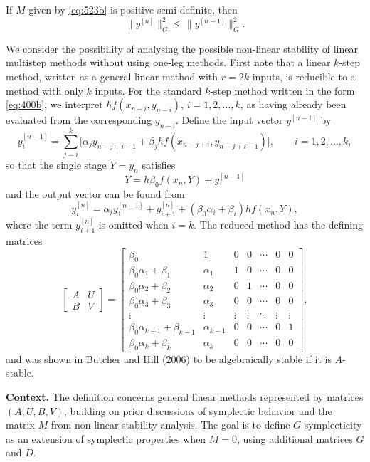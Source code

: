 \begin{theorem}

  \label{thm:523B}
If $M$ given by \eqref{eq:523b} is positive semi-definite, then
\[
\|y^{[n]}\|_G^2 \leq \|y^{[n-1]}\|_G^2.
\]

We consider the possibility of analysing the possible non-linear stability of linear multistep methods without using one-leg methods. First note that a linear $k$-step method, written as a general linear method with $r = 2k$ inputs, is reducible to a method with only $k$ inputs. For the standard $k$-step method written in the form \eqref{eq:400b}, we interpret $hf(x_{n-i}, y_{n-i})$, $i = 1, 2, \dots, k$, as having already been evaluated from the corresponding $y_{n-i}$. Define the input vector $y^{[n-1]}$ by
\[
y_i^{[n-1]} = \sum_{j=i}^{k} \bigl[ \alpha_j y_{n-j+i-1} + \beta_j hf(x_{n-j+i}, y_{n-j+i-1}) \bigr], \qquad i = 1, 2, \dots, k,
\]
so that the single stage $Y = y_n$ satisfies
\[
Y = h\beta_0 f(x_n, Y) + y_1^{[n-1]}
\]
and the output vector can be found from
\[
y_i^{[n]} = \alpha_i y_1^{[n-1]} + y_{i+1}^{[n]} + (\beta_0\alpha_i + \beta_i)hf(x_n, Y),
\]
where the term $y_{i+1}^{[n]}$ is omitted when $i = k$. The reduced method has the defining matrices
\[
\begin{bmatrix}
A & U \\
B & V
\end{bmatrix}
=
\begin{bmatrix}
\beta_0 & 1 & 0 & 0 & \cdots & 0 & 0 \\
\beta_0\alpha_1 + \beta_1 & \alpha_1 & 1 & 0 & \cdots & 0 & 0 \\
\beta_0\alpha_2 + \beta_2 & \alpha_2 & 0 & 1 & \cdots & 0 & 0 \\
\beta_0\alpha_3 + \beta_3 & \alpha_3 & 0 & 0 & \cdots & 0 & 0 \\
\vdots & \vdots & \vdots & \vdots & \ddots & \vdots & \vdots \\
\beta_0\alpha_{k-1} + \beta_{k-1} & \alpha_{k-1} & 0 & 0 & \cdots & 0 & 1 \\
\beta_0\alpha_k + \beta_k & \alpha_k & 0 & 0 & \cdots & 0 & 0
\end{bmatrix},
\tag{524a}
\]
and was shown in Butcher and Hill (2006) to be algebraically stable if it is $A$-stable.
\end{theorem}

\noindent\textbf{Context.}
The definition concerns general linear methods represented by matrices $(A,U,B,V)$, building on prior discussions of symplectic behavior and the matrix $M$ from non-linear stability analysis. The goal is to define $G$-symplecticity as an extension of symplectic properties when $M = 0$, using additional matrices $G$ and $D$.

